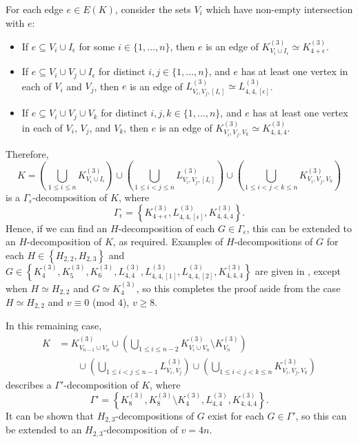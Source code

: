 For each edge $e \in E(K)$, consider the sets $V_i$ which have non-empty intersection with $e$:
\begin{itemize}
    \item If $e \subseteq V_i \cup I_\epsilon$ for some $i \in \{1,\ldots,n\}$, then $e$ is an edge of $K_{V_i \cup I_\epsilon}^{(3)} \simeq K_{4+\epsilon}^{(3)}$.
    \item If $e \subseteq V_i \cup V_j \cup I_\epsilon$ for distinct $i, j \in \{1,\ldots,n\}$, and $e$ has at least one vertex in each of $V_i$ and $V_j$, then $e$ is an edge of $L_{V_i,V_j,[I_\epsilon]}^{(3)} \simeq L_{4,4,[\epsilon]}^{(3)}$.
    \item If $e \subseteq V_i \cup V_j \cup V_k$ for distinct $i, j, k \in \{1,\ldots,n\}$, and $e$ has at least one vertex in each of $V_i$, $V_j$, and $V_k$, then $e$ is an edge of $K_{V_i,V_j,V_k}^{(3)} \simeq K_{4,4,4}^{(3)}$.
\end{itemize}
Therefore,
\[
    K
    = \left( \bigcup_{1 \leq i \leq n} K_{V_i \cup I_\epsilon}^{(3)} \right)
    \cup \left( \bigcup_{1 \leq i < j \leq n} L_{V_i,V_j,[I_\epsilon]}^{(3)} \right)
    \cup \left( \bigcup_{1 \leq i < j < k \leq n} K_{V_i,V_j,V_k}^{(3)} \right)
\]
is a $\Gamma_\epsilon$-decomposition of $K$, where
\[
    \Gamma_\epsilon = \left\{ K_{4+\epsilon}^{(3)}, L_{4,4,[\epsilon]}^{(3)}, K_{4,4,4}^{(3)} \right\}.
\]
Hence, if we can find an $H$-decomposition of each $G \in \Gamma_\epsilon$, this can be extended to an $H$-decomposition of $K$, as required.
Examples of $H$-decompositions of $G$ for each $H \in \left\{ H_{2,2}, H_{2,3} \right\}$
and $G \in \left\{ K_{4}^{(3)}, K_{5}^{(3)}, K_{6}^{(3)}, L_{4,4}^{(3)}, L_{4,4,[1]}^{(3)}, L_{4,4,[2]}^{(3)}, K_{4,4,4}^{(3)} \right\}$
are given in \cite{bryant}, except when $H \simeq H_{2,2}$ and $G \simeq K_{4}^{(3)}$,
so this completes the proof aside from the case $H \simeq H_{2,2}$ and $v \equiv 0$ (mod $4$), $v \geq 8$.

In this remaining case,
\begin{align*}
    K &= K_{V_{n-1} \cup V_n}^{(3)}
    \cup \left( \bigcup_{1 \leq i \leq n-2} K_{V_i \cup V_n}^{(3)} \setminus K_{V_n}^{(3)} \right) \\
    & \quad \quad \cup \left( \bigcup_{1 \leq i < j \leq n-1} L_{V_i, V_j}^{(3)} \right)
    \cup \left( \bigcup_{1 \leq i < j < k \leq n} K_{V_i, V_j, V_k}^{(3)} \right)
\end{align*}
describes a $\Gamma'$-decomposition of $K$, where
\[
    \Gamma' = \left\{ K_{8}^{(3)}, K_{8}^{(3)} \setminus K_{4}^{(3)}, L_{4,4}^{(3)}, K_{4,4,4}^{(3)} \right\}.
\]
It can be shown that $H_{2,3}$-decompositions of $G$ exist for each $G \in \Gamma'$, so this can be extended to
an $H_{2,3}$-decomposition of $v = 4n$.


